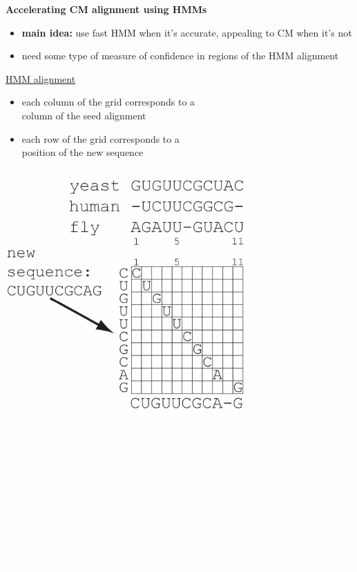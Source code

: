 \documentclass[landscape]{slides}
\begin{document}
\begin{slide}
\begin{center}

\textbf{Accelerating CM alignment using HMMs}
\end{center}
\medskip
\begin{minipage}{6in}
\footnotesize
\begin{itemize}
\item
\textbf{main idea:} use fast HMM when it's accurate, appealing to CM when it's not
\item
need some type of measure of confidence in regions of the HMM alignment

\end{itemize}
\small
\hspace{0.3in}
\underline{HMM alignment}%
\begin{itemize}
\item
each column of the grid corresponds to a \\ column
of the seed alignment
\item
each row of the grid corresponds to a \\ position of the new sequence
\end{itemize}
\vspace{3in}
\end{minipage}
\begin{minipage}{4in}
\begin{center}
\includegraphics[height=6in]{figs/hmm_alignment2_layer2}
\end{center}
\vspace{1.5in}
\end{minipage}
\end{slide}
\end{document}
